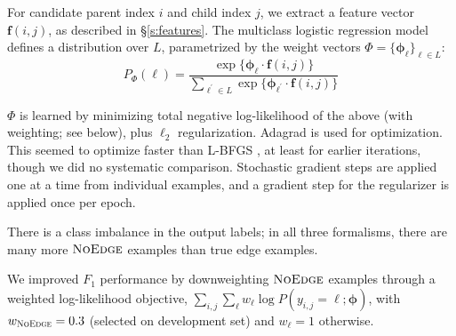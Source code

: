\documentclass[11pt]{article}
\newcommand{\sam}[1]{\textcolor{blue}{[#1 -SMT]}}
\renewcommand{\sam}[1]{}
\newcommand{\noedge}{\textsc{NoEdge}}
\begin{document}
% 
For candidate parent index $i$ and child index $j$, we extract a feature vector
$\bm{f}(i, j)$, as described in \S\ref{s:features}.
The multiclass logistic regression model defines a distribution over $L$,
parametrized by the weight vectors $\Phi = \{\bm\phi_\ell\}_{\ell \in L}$:
\[
  P_\Phi(\ell)  = \frac{
  	\exp\{\bm\phi_\ell \cdot \bm{f}(i, j)\}
  } {
  	\sum_{\ell^\prime \in L} {
  		\exp\{\bm\phi_{\ell^\prime} \cdot \bm{f}(i, j)\}
  	}
  }
\]

\noindent
$\Phi$ is learned by minimizing total negative log-likelihood of the above
(with weighting; see below), plus $\ell_2$ regularization.
Adagrad \cite{duchi_adaptive_2011} is used for optimization.
This seemed to optimize faster than L-BFGS \cite{byrd_limited_1995}, at least for earlier
iterations, though we did no systematic comparison. Stochastic gradient steps are applied one at a time from individual examples, and a gradient step for the regularizer is applied once per epoch.

There is a class imbalance in the output labels; in all three formalisms, there
are many more $\noedge$ examples than true edge examples.
\sam{If we get these numbers, it would be nicer to quantify, and say something
like ``In the FFF formalism, the training set (\S\ref{s:evaluation}) contains NNN
candidate edges (pairs of tokens with length between 1 and 10 inclusive), and NNN actual (non-null) edges.''}
We improved $F_1$ performance by
downweighting $\noedge$ examples through a weighted log-likelihood objective,
$\sum_{i,j} \sum_\ell w_\ell \log P(y_{i,j}=\ell; \bm\phi)$, 
with $w_{\noedge}=0.3$ (selected on development set)
and $w_{\ell} = 1$ otherwise.
\end{document}
